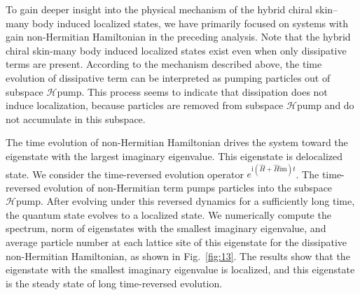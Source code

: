 \documentclass[longbibliography, aps, prx, amsmath, amssymb, amsfonts, twocolumn,superscriptaddress, footinbib]{revtex4-1}
\begin{document}
	
	To gain deeper insight into the physical mechanism of the hybrid chiral skin–many body induced localized states, we have primarily focused on systems with gain non-Hermitian Hamiltonian in the preceding analysis. 
	Note that the hybrid chiral skin-many body induced localized states exist even when only dissipative terms are present.
	According to the mechanism described above, the time evolution of dissipative term can be interpreted as pumping particles out of subspace $\mathscr{H}{\text{pump}}$. This process seems to indicate that dissipation does not induce localization, because particles are removed from subspace $\mathscr{H}{\text{pump}}$ and do not accumulate in this subspace.

	The time evolution of non-Hermitian Hamiltonian drives the system toward the eigenstate with the largest imaginary eigenvalue. This eigenstate is delocalized state.
	We consider the time-reversed evolution operator $e^{\mathrm{i}(\hat{H} + \hat{H}{\text{im}})t}$. The time-reversed evolution of non-Hermitian term pumps particles into the subspace $\mathscr{H}{\text{pump}}$. After evolving under this reversed dynamics for a sufficiently long time, the quantum state evolves to a localized state.
	We numerically compute the spectrum, norm of eigenstates with the smallest imaginary eigenvalue, and average particle number at each lattice site of this eigenstate for the dissipative non-Hermitian Hamiltonian, as shown in Fig.~\ref{fig:13}. The results show that the eigenstate with the smallest imaginary eigenvalue is localized, and this eigenstate is the steady state of long time-reversed evolution.

\end{document}
